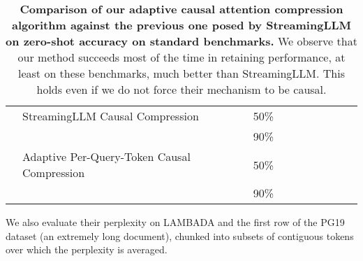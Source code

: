 \begin{table}[H]
{\begin{tabular}{@{}llllllllll@{}}
                      & StreamingLLM Causal Compression             & 50\%              &       &       &           &         &            &       &            \\
                      &                                             & 90\%              &       &       &           &         &            &       &            \\
                      & Adaptive Per-Query-Token Causal Compression & 50\%              &       &       &           &         &            &       &            \\
                      &                                             & 90\%              &       &       &           &         &            &       &            \\ \bottomrule
        \end{tabular}
    }
    \caption{\textbf{Comparison of our adaptive causal attention compression algorithm against the previous one posed by StreamingLLM \citep{xiao2023efficient} on zero-shot accuracy on standard benchmarks.} We observe that our method succeeds most of the time in retaining performance, at least on these benchmarks, much better than StreamingLLM. This holds even if we do not force their mechanism to be causal.}
    \label{tab:compare_ours_streamingllm_zeroshot}
\end{table}



We also evaluate their perplexity on LAMBADA and the first row of the PG19 dataset (an extremely long document), chunked into  subsets of  contiguous tokens over which the perplexity is averaged.

